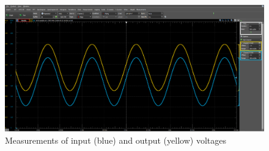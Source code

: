 \documentclass[12pt]{article}
\begin{document}
\begin{landscape}
\begin{figure}[ht!]
\begin{minipage}[b]{0.5\linewidth}
        \centering
        \includegraphics[width=\linewidth]{images/Measurements.png} 
        \caption{Measurements of input (blue) and output (yellow) voltages} 
    \end{minipage}%
\end{figure}
\end{landscape}
\end{document}

